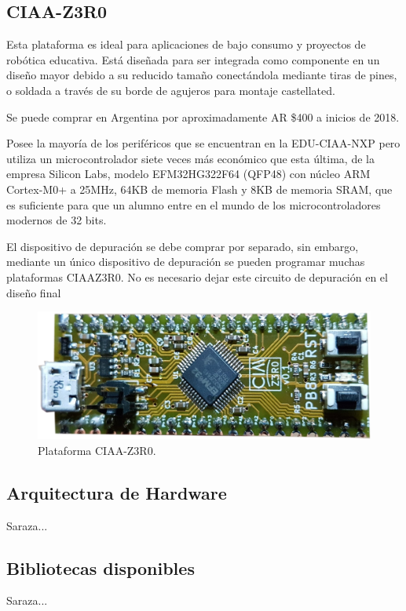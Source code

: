 \subsection{CIAA-Z3R0}

Esta plataforma es ideal para aplicaciones de bajo consumo y proyectos de robótica educativa. Está diseñada para ser integrada como componente en un diseño mayor debido a su reducido tamaño conectándola mediante tiras de pines, o soldada a través de su borde de agujeros para montaje castellated.

Se puede comprar en Argentina por aproximadamente AR \$400 a inicios de 2018.

Posee la mayoría de los periféricos que se encuentran en la EDU-CIAA-NXP pero utiliza un microcontrolador siete veces más económico que esta última, de la empresa Silicon Labs, modelo EFM32HG322F64 (QFP48) con núcleo ARM Cortex-M0+ a 25MHz, 64KB de memoria Flash y 8KB de memoria SRAM, que es suficiente para que un alumno entre en el mundo de los microcontroladores modernos de 32 bits.

El dispositivo de depuración se debe comprar por separado, sin embargo, mediante un único dispositivo de depuración se pueden programar muchas plataformas CIAAZ3R0.
No es necesario dejar este circuito de depuración en el diseño final

\begin{figure}[!htbp]
\begin{center}  %
\includegraphics*[width=\textwidth]{Figures/CIAA-Z3R0_Foto.png}
\par\caption{Plataforma CIAA-Z3R0.}\label{fig:ciaaZero}
\end{center}
\end{figure}

\subsection{Arquitectura de Hardware}

Saraza...

\subsection{Bibliotecas disponibles}

Saraza...
